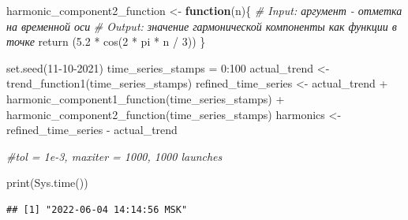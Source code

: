 \documentclass[specialist,
               substylefile = spbu_report.rtx,
               subf,href,colorlinks=true, 12pt]{disser}
\theoremstyle{definition}
\newenvironment{Shaded}{\begin{snugshade}}{\end{snugshade}}
\newcommand{\CommentTok}[1]{\textcolor[rgb]{0.56,0.35,0.01}{\textit{#1}}}
\newcommand{\ControlFlowTok}[1]{\textcolor[rgb]{0.13,0.29,0.53}{\textbf{#1}}}
\newcommand{\DecValTok}[1]{\textcolor[rgb]{0.00,0.00,0.81}{#1}}
\newcommand{\FloatTok}[1]{\textcolor[rgb]{0.00,0.00,0.81}{#1}}
\newcommand{\FunctionTok}[1]{\textcolor[rgb]{0.00,0.00,0.00}{#1}}
\newcommand{\NormalTok}[1]{#1}
\newcommand{\OtherTok}[1]{\textcolor[rgb]{0.56,0.35,0.01}{#1}}
\newcommand{\SpecialCharTok}[1]{\textcolor[rgb]{0.00,0.00,0.00}{#1}}
\begin{document}
\begin{Shaded}
\begin{Highlighting}[]
\NormalTok{    harmonic\_component2\_function }\OtherTok{\textless{}{-}} \ControlFlowTok{function}\NormalTok{(n)\{}
      \CommentTok{\# Input: аргумент {-} отметка на временной оси}
      \CommentTok{\# Output: значение гармонической компоненты как функции в точке}
      \FunctionTok{return}\NormalTok{ (}\FloatTok{5.2} \SpecialCharTok{*} \FunctionTok{cos}\NormalTok{(}\DecValTok{2} \SpecialCharTok{*}\NormalTok{ pi }\SpecialCharTok{*}\NormalTok{ n }\SpecialCharTok{/} \DecValTok{3}\NormalTok{))}
\NormalTok{    \}}
\end{Highlighting}
\end{Shaded}

\begin{Shaded}
\begin{Highlighting}[]
    \FunctionTok{set.seed}\NormalTok{(}\DecValTok{11{-}10{-}2021}\NormalTok{)}
\NormalTok{    time\_series\_stamps }\OtherTok{=} \DecValTok{0}\SpecialCharTok{:}\DecValTok{100}
\NormalTok{    actual\_trend }\OtherTok{\textless{}{-}} \FunctionTok{trend\_function1}\NormalTok{(time\_series\_stamps)}
\NormalTok{    refined\_time\_series }\OtherTok{\textless{}{-}}\NormalTok{ actual\_trend }\SpecialCharTok{+}
\\ \FunctionTok{harmonic\_component1\_function}\NormalTok{(time\_series\_stamps) }\SpecialCharTok{+}
\\ \FunctionTok{harmonic\_component2\_function}\NormalTok{(time\_series\_stamps)}
\NormalTok{    harmonics }\OtherTok{\textless{}{-}}\NormalTok{ refined\_time\_series }\SpecialCharTok{{-}}\NormalTok{ actual\_trend}
\end{Highlighting}
\end{Shaded}

\begin{Shaded}
\begin{Highlighting}[]
  \CommentTok{\#tol = 1e{-}3, maxiter = 1000, 1000 launches}

  \FunctionTok{print}\NormalTok{(}\FunctionTok{Sys.time}\NormalTok{())}
\end{Highlighting}
\end{Shaded}

\begin{verbatim}
## [1] "2022-06-04 14:14:56 MSK"
\end{verbatim}
\end{document}
